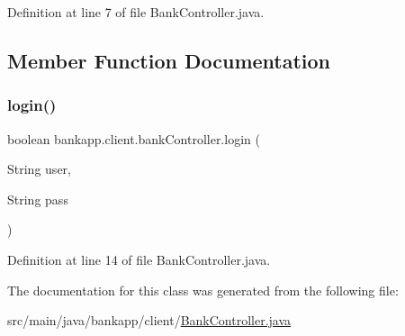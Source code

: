 Definition at line 7 of file Bank\+Controller.\+java.



\subsection{Member Function Documentation}
\mbox{\label{classbankapp_1_1client_1_1bank_controller_aed80209fad3f3fee830107d259afb445}} 
\subsubsection{\texorpdfstring{login()}{login()}}
{\footnotesize\ttfamily boolean bankapp.\+client.\+bank\+Controller.\+login (\begin{DoxyParamCaption}\item[{String}]{user,  }\item[{String}]{pass }\end{DoxyParamCaption})}



Definition at line 14 of file Bank\+Controller.\+java.



The documentation for this class was generated from the following file\+:\begin{DoxyCompactItemize}
\item 
src/main/java/bankapp/client/\hyperlink{_bank_controller_8java}{Bank\+Controller.\+java}\end{DoxyCompactItemize}
